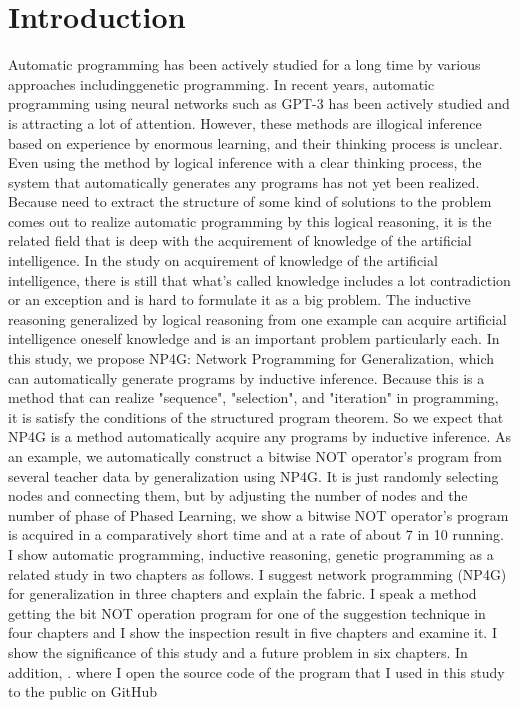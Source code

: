 \documentclass{article}
\begin{document}
\section{Introduction}
Automatic programming has been actively studied for a long time by various approaches includinggenetic programming.
In recent years, automatic programming using neural networks such as GPT-3\cite{gpt3} has been actively studied and is attracting a lot of attention.
However, these methods are illogical inference based on experience by enormous learning, and their thinking process is unclear.
Even using the method by logical inference with a clear thinking process, the system that automatically generates any programs has not yet been realized. 
Because need to extract the structure of some kind of solutions to the problem comes out to realize automatic programming by this logical reasoning, it is the related field that is deep with the acquirement of knowledge of the artificial intelligence.
In the study on acquirement of knowledge of the artificial intelligence, there is still that what's called knowledge includes a lot contradiction or an exception and is hard to formulate it as a big problem.
The inductive reasoning generalized by logical reasoning from one example can acquire artificial intelligence oneself knowledge and is an important problem particularly each.
In this study, we propose NP4G: Network Programming for Generalization, which can automatically generate programs by inductive inference.
Because this is a method that can realize "sequence", "selection", and "iteration" in programming, it is satisfy the conditions of the structured program theorem. So we expect that NP4G is a method automatically acquire any programs by inductive inference.
As an example, we automatically construct a bitwise NOT operator's program from several teacher data by generalization using NP4G.
It is just randomly selecting nodes and connecting them, but by adjusting the number of nodes and the number of phase of Phased Learning, we show a bitwise NOT operator's program is acquired in a comparatively short time and at a rate of about 7 in 10 running.
I show automatic programming, inductive reasoning, genetic programming as a related study in two chapters as follows.
I suggest network programming (NP4G) for generalization in three chapters and explain the fabric.
I speak a method getting the bit NOT operation program for one of the suggestion technique in four chapters and I show the inspection result in five chapters and examine it.
I show the significance of this study and a future problem in six chapters.
In addition, \footnotemark[1]. where I open the source code of the program that I used in this study to the public on GitHub
\end{document}
